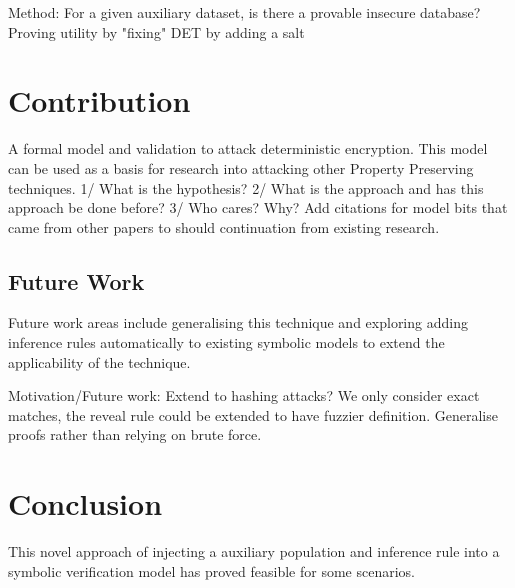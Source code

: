 \documentclass[journal]{IEEEtran}
\begin{document}
Method: For a given auxiliary dataset, is there a provable insecure database?  
Proving utility by "fixing" DET by adding a salt

\section{Contribution}

A formal model and validation to attack deterministic encryption. This model can be used as a basis for research into attacking other Property Preserving techniques.
1/ What is the hypothesis?
2/ What is the approach and has this approach be done before?
3/ Who cares? Why?
		Add citations for model bits that came from other papers to should continuation from existing research. 

\subsection{Future Work}
Future work areas include generalising this technique and exploring adding inference rules automatically to existing symbolic models to extend the applicability of the technique.

Motivation/Future work: Extend to hashing attacks? 	We only consider exact matches, the reveal rule could be extended to have fuzzier definition.
	Generalise proofs rather than relying on brute force.
\section{Conclusion}
This novel approach of injecting a auxiliary population and inference rule into a symbolic verification model has proved feasible for some scenarios. 
\end{document}
